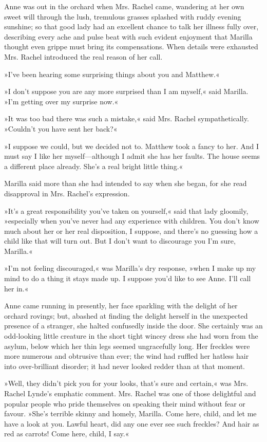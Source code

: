 Anne was out in the orchard when Mrs. Rachel came, wandering at her own sweet will through the lush, tremulous grasses splashed with ruddy evening sunshine; so that good lady had an excellent chance to talk her illness fully over, describing every ache and pulse beat with such evident enjoyment that Marilla thought even grippe must bring its compensations. When details were exhausted Mrs. Rachel introduced the real reason of her call.

»I’ve been hearing some surprising things about you and Matthew.«

»I don’t suppose you are any more surprised than I am myself,« said Marilla. »I’m getting over my surprise now.«

»It was too bad there was such a mistake,« said Mrs. Rachel sympathetically. »Couldn’t you have sent her back?«

»I suppose we could, but we decided not to. Matthew took a fancy to her. And I must say I like her myself—although I admit she has her faults. The house seems a different place already. She’s a real bright little thing.«

Marilla said more than she had intended to say when she began, for she read disapproval in Mrs. Rachel’s expression.

»It’s a great responsibility you’ve taken on yourself,« said that lady gloomily, »especially when you’ve never had any experience with children. You don’t know much about her or her real disposition, I suppose, and there’s no guessing how a child like that will turn out. But I don’t want to discourage you I’m sure, Marilla.«

»I’m not feeling discouraged,« was Marilla’s dry response, »when I make up my mind to do a thing it stays made up. I suppose you’d like to see Anne. I’ll call her in.«

Anne came running in presently, her face sparkling with the delight of her orchard rovings; but, abashed at finding the delight herself in the unexpected presence of a stranger, she halted confusedly inside the door. She certainly was an odd-looking little creature in the short tight wincey dress she had worn from the asylum, below which her thin legs seemed ungracefully long. Her freckles were more numerous and obtrusive than ever; the wind had ruffled her hatless hair into over-brilliant disorder; it had never looked redder than at that moment.

»Well, they didn’t pick you for your looks, that’s sure and certain,« was Mrs. Rachel Lynde’s emphatic comment. Mrs. Rachel was one of those delightful and popular people who pride themselves on speaking their mind without fear or favour. »She’s terrible skinny and homely, Marilla. Come here, child, and let me have a look at you. Lawful heart, did any one ever see such freckles? And hair as red as carrots! Come here, child, I say.«

